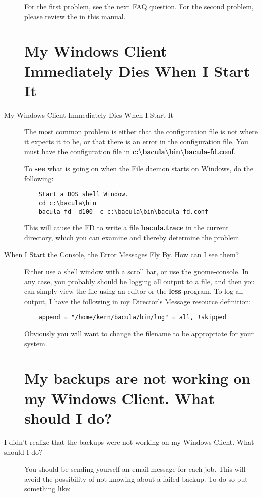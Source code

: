 \begin{description}
   For the first problem, see the next FAQ question.  For the second
   problem, please review the  in this manual.

\label{windowsdie}
\section{My Windows Client Immediately Dies When I Start It}
\item [My Windows Client Immediately Dies When I Start It]
The most common problem is either that the configuration file is not where
it expects it to be, or that there is an error in the configuration file.
You must have the configuration file in {\bf
c:\textbackslash{}bacula\textbackslash{}bin\textbackslash{}bacula-fd.conf}.

To {\bf see} what is going on when the File daemon starts  on Windows, do the
following:

\footnotesize
\begin{verbatim}
    Start a DOS shell Window.
    cd c:\bacula\bin
    bacula-fd -d100 -c c:\bacula\bin\bacula-fd.conf

\end{verbatim}
\normalsize

This will cause the FD to write a file {\bf bacula.trace}  in the current
directory, which you can examine and thereby determine  the problem.

\label{scroll}
\item [When I Start the Console, the Error Messages Fly By. How can I see
   them? ]
   Either use a shell window with a scroll bar, or use the gnome-console.
   In any case, you probably should be logging all output to a file, and
   then you can simply view the file using an editor or the {\bf less}
   program.  To log all output, I have the following in my Director's
   Message resource definition:

\footnotesize
\begin{verbatim}
    append = "/home/kern/bacula/bin/log" = all, !skipped

\end{verbatim}
\normalsize

Obviously you will want to change the filename to be appropriate  for your
system.

\label{nobackup}
\section{My backups are not working on my Windows
   Client. What should I do?}
\item [I didn't realize that the backups were not working on my Windows
   Client. What should I do? ]
You should be sending yourself an email message for each job. This will  avoid
the possibility of not knowing about a failed backup. To do so  put something
like:


\end{description}
